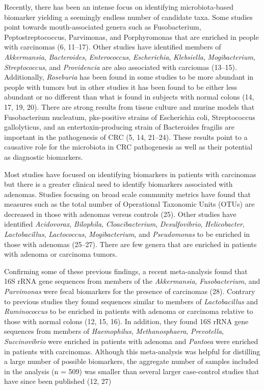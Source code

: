 \documentclass[12pt,]{article}
\begin{document}
Recently, there has been an intense focus on identifying
microbiota-based biomarker yielding a seemingly endless number of
candidate taxa. Some studies point towards mouth-associated genera such
as Fusobacterium, Peptostreptococcus, Parvimonas, and Porphyromonas that
are enriched in people with carcinomas (6, 11--17). Other studies have
identified members of \emph{Akkermansia}, \emph{Bacteroides},
\emph{Enterococcus}, \emph{Escherichia}, \emph{Klebsiella},
\emph{Mogibacterium}, \emph{Streptococcus}, and \emph{Providencia} are
also associated with carciomas (13--15). Additionally, \emph{Roseburia}
has been found in some studies to be more abundant in people with tumors
but in other studies it has been found to be either less abundant or no
different than what is found in subjects with normal colons (14, 17, 19,
20). There are strong results from tissue culture and murine models that
Fusobacterium nucleatum, pks-positive strains of Escherichia coli,
Streptococcus gallolyticus, and an entertoxin-producing strain of
Bacteroides fragilis are important in the pathogenesis of CRC (5, 14,
21--24). These results point to a causative role for the microbiota in
CRC pathogenesis as well as their potential as diagnostic biomarkers.

Most studies have focused on identifying biomarkers in patients with
carcinomas but there is a greater clinical need to identify biomarkers
associated with adenomas. Studies focusing on broad scale community
metrics have found that measures such as the total number of Operational
Taxonomic Units (OTUs) are decreased in those with adenomas versus
controls (25). Other studies have identified \emph{Acidovorax},
\emph{Bilophila}, \emph{Cloacibacterium}, \emph{Desulfovibrio},
\emph{Helicobacter}, \emph{Lactobacillus}, \emph{Lactococcus},
\emph{Mogibacterium}, and \emph{Pseudomonas} to be enriched in those
with adenomas (25--27). There are few genera that are enriched in
patients with adenoma or carcinoma tumors.

Confirming some of these previous findings, a recent meta-analysis found
that 16S rRNA gene sequences from members of the \emph{Akkermansia},
\emph{Fusobacterium}, and \emph{Parvimonas} were fecal biomarkers for
the presence of carcinomas (28). Contrary to previous studies they found
sequences similar to members of \emph{Lactobacillus} and
\emph{Ruminococcus} to be enriched in patients with adenoma or carcinoma
relative to those with normal colons (12, 15, 16). In addition, they
found 16S rRNA gene sequences from members of \emph{Haemophilus},
\emph{Methanosphaera}, \emph{Prevotella}, \emph{Succinovibrio} were
enriched in patients with adenoma and \emph{Pantoea} were enriched in
patients with carcinomas. Although this meta-analysis was helpful for
distilling a large number of possible biomarkers, the aggregate number
of samples included in the analysis (n = 509) was smaller than several
larger case-control studies that have since been published (12, 27)
\end{document}
